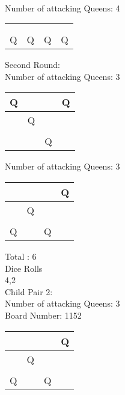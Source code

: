 \documentclass[a4paper,10pt]{article}
\begin{document}
\begin{flushleft}
\begin{flushleft}
\begin{flushleft}
\begin{flushleft}
\begin{flushleft}
\begin{flushleft}
\begin{flushleft}
\begin{flushleft}
\begin{flushleft}
\begin{flushleft}
\begin{flushleft}
\begin{flushleft}
\begin{flushleft}
\begin{flushleft}
\begin{flushleft}
\begin{flushleft}
\begin{flushleft}
\begin{flushleft}
\begin{tabular}{| l | l | l | l |}
    \end{tabular}
\break
\\
Number of attacking Queens: 4\\
\vspace{5mm}
    \begin{tabular}{| l | l | l | l |}
    \hline
     & & & \\ \hline
     & & & \\ \hline
     & & & \\ \hline
     Q & Q & Q & Q \\ \hline
    \end{tabular}
\break
Second Round:\\
Number of attacking Queens: 3\\
\vspace{5mm}
    \begin{tabular}{| l | l | l | l |}
    \hline
     Q & & & Q \\ \hline
     & Q& & \\ \hline
     & & & \\ \hline
     & & Q & \\ \hline
    \end{tabular}
\break
Number of attacking Queens: 3\\
\vspace{5mm}
    \begin{tabular}{| l | l | l | l |}
    \hline
     & & & Q\\ \hline
     & Q & & \\ \hline
     & & & \\ \hline
     Q & & Q & \\ \hline
    \end{tabular}
\break
Total : 6\\
Dice Rolls\\
4,2\\
Child Pair 2:\\
Number of attacking Queens: 3\\
Board Number: 1152\\
\vspace{5mm}
    \begin{tabular}{| l | l | l | l |}
    \hline
     & & & Q\\ \hline
     & Q & & \\ \hline
     & & & \\ \hline
     Q & & Q & \\ \hline
    \end{tabular}
\break
\\

\end{flushleft}
\end{flushleft}
\end{flushleft}
\end{flushleft}
\end{flushleft}
\end{flushleft}
\end{flushleft}
\end{flushleft}
\end{flushleft}
\end{flushleft}
\end{flushleft}
\end{flushleft}
\end{flushleft}
\end{flushleft}
\end{flushleft}
\end{flushleft}
\end{flushleft}
\end{flushleft}
\end{document}
